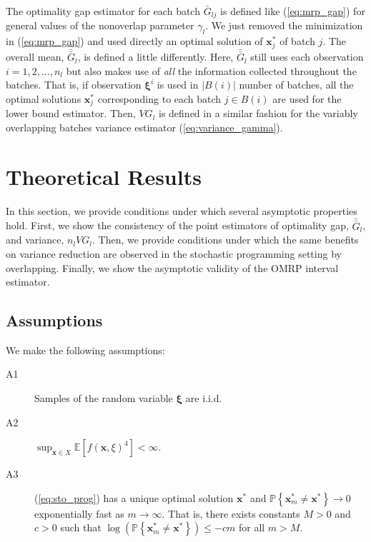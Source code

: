 \documentclass[12pt]{article}
\newcommand{\p}[1]{\mathbb{P} \left\{ #1 \right\}}
\newcommand{\e}[1]{\mathbb{E} \left[ #1 \right]
}
\newcommand{\x}{\mathbf{x}}
\newcommand{\xs}{\x^*}
\newcommand{\xit}{\boldsymbol{\xi}}
\newcommand{\xiti}{\xit^i}
\newcommand{\gb}{\bar{G}}
\newcommand{\gbb}{\bar{\gb}}
\begin{document}
The optimality gap estimator for each batch $\gb_{lj}$ is defined like (\ref{eq:mrp_gap}) for general values of the nonoverlap parameter $\gamma_l$.  
We just removed the minimization in (\ref{eq:mrp_gap}) and used directly an optimal solution of $\xs_j$ of batch $j$.  
The overall mean, $\gbb_l$, is defined a little differently.  
Here, $\gbb_l$ still uses each observation $i = 1, 2, \dots, n_l$ but also makes use of {\it all} the information collected throughout the batches.  
That is, if observation $\xiti$ is used in $|B(i)|$ number of batches, all the optimal solutions $\xs_j$ corresponding to each batch $j \in B(i)$ are used for the lower bound estimator.  
Then, $VG_l$ is defined in a similar fashion for the variably overlapping batches variance estimator (\ref{eq:variance_gamma}).

\section{Theoretical Results} 
\label{sec:theory}

In this section, we provide conditions under which several asymptotic properties hold. 
First, we show the consistency of the point estimators of optimality gap, $\gbb_l$, and variance, $n_l VG_l$. 
Then, we provide conditions under which the same benefits on variance reduction are observed in the stochastic programming setting by overlapping. 
Finally, we show the asymptotic validity of the OMRP interval estimator. 

\subsection{Assumptions}
\label{subsec:assumptions}

We make the following assumptions:

\begin{description}
	\item[A1] Samples of the random variable $\xit$ are i.i.d.
	\item[A2] $\sup_{\x \in X} \e{f(\x,\xi)^{4}} < \infty$.
	\item[A3] (\ref{eq:sto_prog}) has a unique optimal solution $\xs$ and $\p{\xs_m \neq \xs} \rightarrow 0$ exponentially fast as $m \rightarrow \infty$.  
           That is, there exists constants $M > 0$ and $c > 0$ such that $\log(\p{\xs_m \neq \xs}) \leq -cm$ for all $m > M$.
\end{description}
\end{document}
